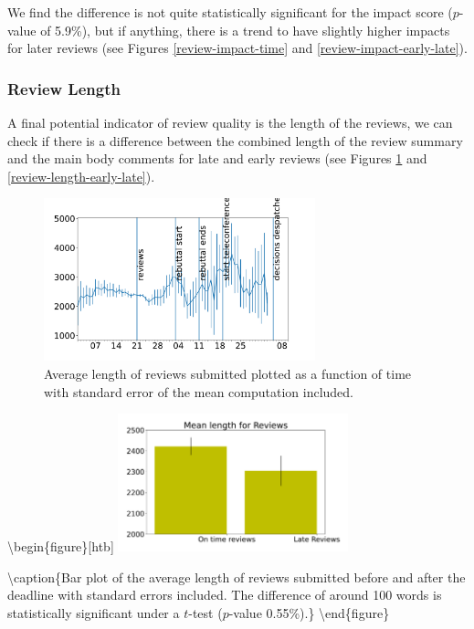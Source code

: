 We find the difference is not quite statistically significant for the
impact score (\(p\)-value of 5.9\%), but if anything, there is a trend
to have slightly higher impacts for later reviews (see Figures
\ref{review-impact-time} and \ref{review-impact-early-late}).

\hypertarget{review-length}{%
\subsubsection{Review Length}\label{review-length}}

A final potential indicator of review quality is the length of the
reviews, we can check if there is a difference between the combined
length of the review summary and the main body comments for late and
early reviews (see Figures \ref{review-length-time} and
\ref{review-length-early-late}).

\begin{figure}[htb]
\includegraphics[width=0.70\textwidth]{diagrams/neurips/review-length-time.pdf}


\caption{Average length of reviews submitted plotted as a function of time with standard error of the mean computation included.}
\label{review-length-time}
\end{figure}

\textbackslash begin\{figure\}{[}htb{]}
\includegraphics[width=0.50\textwidth]{diagrams/neurips/review-length-early-late.pdf}

\textbackslash caption\{Bar plot of the average length of reviews
submitted before and after the deadline with standard errors included.
The difference of around 100 words is statistically significant under a
\(t\)-test (\(p\)-value 0.55\%).\} \label{review-length-early-late}
\textbackslash end\{figure\}

